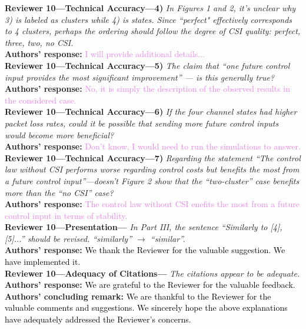 \begin{bibunit}
\textbf{Reviewer 10---Technical Accuracy---4)}\textit{%
In Figures 1 and 2, it's unclear why 3) is labeled as clusters while 4) is states. Since ``perfect" effectively corresponds to 4 clusters, perhaps the ordering should follow the degree of CSI quality: perfect, three, two, no CSI.}\\[2mm]
\textbf{Authors' response:} \textcolor{violet}{I will provide additional details...}\\[4mm]
\textbf{Reviewer 10---Technical Accuracy---5)}\textit{%
The claim that ``one future control input provides the most significant improvement'' --- is this generally true?}\\[2mm]
\textbf{Authors' response:} \textcolor{violet}{No, it is simply the description of the observed results in the considered case.}\\[4mm]
\textbf{Reviewer 10---Technical Accuracy---6)}\textit{%
If the four channel states had higher packet loss rates, could it be possible that sending more future control inputs would become more beneficial?}\\[2mm]
\textbf{Authors' response:} \textcolor{violet}{Don't know, I would need to run the simulations to answer.}\\[4mm]
\textbf{Reviewer 10---Technical Accuracy---7)}\textit{%
Regarding the statement ``The control law without CSI performs worse regarding control costs but benefits the most from a future control input''---doesn't Figure 2 show that the ``two-cluster'' case benefits more than the ``no CSI'' case?}\\[2mm]
\textbf{Authors' response:} \textcolor{violet}{The control law without CSI enefits the most from a future control input in terms of stability.}\\[4mm]
\textbf{Reviewer 10---Presentation---}\textit{%
In Part III, the sentence ``Similarly to [4], [5]...'' should be revised. ``similarly'' $\to$ ``similar''.}\\[2mm]
\textbf{Authors' response:} \textcolor{black}{We thank the Reviewer for the valuable suggestion. We have implemented it.}\\[4mm]
\textbf{Reviewer 10---Adequacy of Citations---}\textit{%
The citations appear to be adequate.}\\[2mm]
\textbf{Authors' response:} \textcolor{black}{We are grateful to the Reviewer for the valuable feedback.}\\[4mm]
\textbf{Authors' concluding remark:} \textcolor{black}{We are thankful to the Reviewer for the valuable comments and suggestions. We sincerely hope the above explanations have adequately addressed the Reviewer's concerns.}\\ 
\putbib
\end{bibunit}